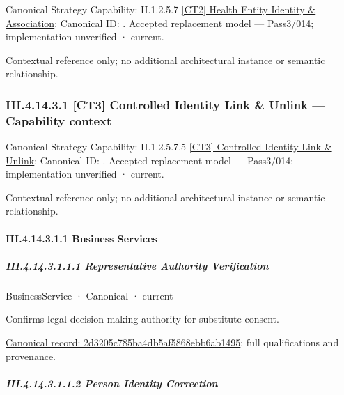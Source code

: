 {\small Canonical Strategy Capability: II.1.2.5.7 \hyperref[element:7cbb4c6253164e19ab3a126c8f176f21]{[CT2] Health Entity Identity \& Association}; Canonical ID: \texttt{}. Accepted replacement model — Pass3/014; implementation unverified · current.}\par
Contextual reference only; no additional architectural instance or semantic relationship.\par
\subsubsection*{III.4.14.3.1 [CT3] Controlled Identity Link \& Unlink — Capability context}
\label{navigation:III.4.14.3.1}

{\small Canonical Strategy Capability: II.1.2.5.7.5 \hyperref[element:34f95770622e4077a87a669f9b279019]{[CT3] Controlled Identity Link \& Unlink}; Canonical ID: \texttt{}. Accepted replacement model — Pass3/014; implementation unverified · current.}\par
Contextual reference only; no additional architectural instance or semantic relationship.\par
\paragraph*{III.4.14.3.1.1 Business Services}
\label{navigation:III.4.14.3.1.1}

\subparagraph*{III.4.14.3.1.1.1 Representative Authority Verification}
\label{navigation:III.4.14.3.1.1.1}

\label{element:2d3205c785ba4db5af5868ebb6ab1495}
{\small BusinessService · Canonical · current}\par

Confirms legal decision-making authority for substitute consent.


{\footnotesize \href{../../../../../../../../continuum/business/business-service/2d3205c785ba4db5af5868ebb6ab1495.md}{Canonical record: 2d3205c785ba4db5af5868ebb6ab1495}; full qualifications and provenance.}\par
\subparagraph*{III.4.14.3.1.1.2 Person Identity Correction}
\label{navigation:III.4.14.3.1.1.2}

